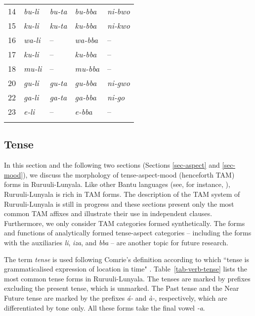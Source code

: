 \begin{table}[!hbt]
\begin{tabular}{llll l}
	14&\textit{bu-li}&\textit{bu-ta}&\textit{bu-bba}		&\textit{ni-bwo}\\
	15&\textit{ku-li}&\textit{ku-ta}&\textit{ku-bba}		&\textit{ni-kwo}\\
        16&\textit{wa-li}& – &\textit{wa-bba}				& –\\
        17&\textit{ku-li}& – &\textit{ku-bba}				& –\\
        18&\textit{mu-li}& – &\textit{mu-bba}				& –\\      
        20 & \textit{gu-li} & \textit{gu-ta} & \textit{gu-bba}	&\textit{ni-gwo}\\
	22 & \textit{ga-li} & \textit{ga-ta} & \textit{ga-bba}	&\textit{ni-go}\\
        23&\textit{e-li}& – &\textit{e-bba}				& –\\             
\lspbottomrule
	\end{tabular}
\label{tab:subjectagreementlitaabba}
\end{table}


\subsection{Tense}\label{sec-tense}

In this section and the following two sections (Sections \ref{sec-aspect} and \ref{sec-mood}), we discuss the morphology of tense-aspect-mood (henceforth TAM) forms in Ru\-ruu\-li\hyp{}Lu\-nya\-la. 
Like other Bantu languages (see, for instance, \citealt{Nurse2008Tense}), Ru\-ruu\-li\hyp{}Lu\-nya\-la is rich in TAM forms. 
The description of the TAM system of Ru\-ruu\-li\hyp{}Lu\-nya\-la is still in progress and these sections  present only the most common TAM affixes and illustrate their use in independent clauses. 
Furthermore, we only consider TAM categories formed synthetically. The forms and functions of analytically formed tense-aspect categories – including the forms with the auxiliaries \textit{li}, \textit{iza}, and \textit{bba} – are another topic for future research. 

The term \textit{tense} is used following Comrie’s definition according to which ``tense is grammaticalised expression of location in time" \citep[9]{Comrie1985Tense}. 
Table~\ref{tab-verb-tense} lists the most common tense forms in Ru\-ruu\-li\hyp{}Lu\-nya\-la. 
The tenses are marked by prefixes excluding the present tense, which is unmarked. 
The Past tense and the Near Future tense are marked by the  prefixes \textit{á-} and \textit{à-}, respectively, which are differentiated by tone only. 
All these forms take the final vowel \textit{-a}.

